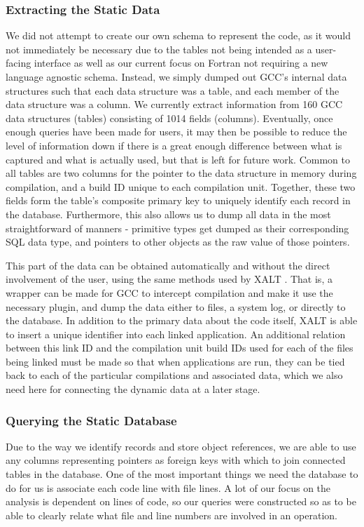 \subsubsection{Extracting the Static Data}
We did not attempt to create our own schema to represent the code, as it would not immediately be necessary due to the tables not being intended as a user-facing interface as well as our current focus on Fortran not requiring a new language agnostic schema.
Instead, we simply dumped out \acs{GCC}'s internal data structures such that each data structure was a table, and each member of the data structure was a column.
We currently extract information from 160 \acs{GCC} data structures (tables) consisting of 1014 fields (columns).
Eventually, once enough queries have been made for users, it may then be possible to reduce the level of information down if there is a great enough difference between what is captured and what is actually used, but that is left for future work.
Common to all tables are two columns for the pointer to the data structure in memory during compilation, and a build ID unique to each compilation unit.
Together, these two fields form the table's composite primary key to uniquely identify each record in the database.
Furthermore, this also allows us to dump all data in the most straightforward of manners - primitive types get dumped as their corresponding \acs{SQL} data type, and pointers to other objects as the raw value of those pointers.

This part of the data can be obtained automatically and without the direct involvement of the user, using the same methods used by XALT \cite{7081224}.
That is, a wrapper can be made for \acs{GCC} to intercept compilation and make it use the necessary plugin, and dump the data either to files, a system log, or directly to the database.
In addition to the primary data about the code itself, XALT is able to insert a unique identifier into each linked application.
An additional relation between this link ID and the compilation unit build IDs used for each of the files being linked must be made so that when applications are run, they can be tied back to each of the particular compilations and associated data, which we also need here for connecting the dynamic data at a later stage.
\subsubsection{Querying the Static Database}
\label{sec:querying}
Due to the way we identify records and store object references, we are able to use any columns representing pointers as foreign keys with which to join connected tables in the database.
One of the most important things we need the database to do for us is associate each code line with file lines.
A lot of our focus on the analysis is dependent on lines of code, so our queries were constructed so as to be able to clearly relate what file and line numbers are involved in an operation.

